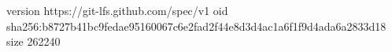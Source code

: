 version https://git-lfs.github.com/spec/v1
oid sha256:b8727b41bc9fedae95160067c6e2fad2f44e8d3d4ac1a6f1f9d4ada6a2833d18
size 262240
